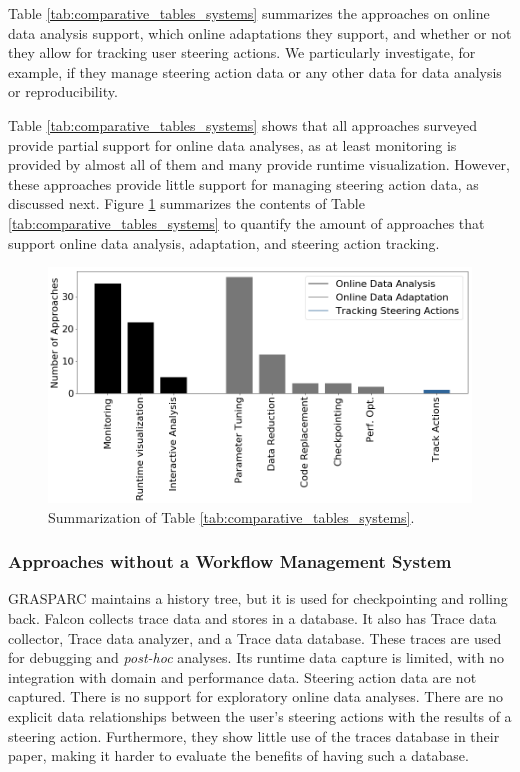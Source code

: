 Table \ref{tab:comparative_tables_systems} summarizes the approaches on  online data analysis support, which online adaptations they support, and whether or not they allow for tracking user steering actions.
We particularly investigate, for example, if they manage steering action data or
any other data for data analysis or reproducibility.




Table \ref{tab:comparative_tables_systems} shows that all approaches surveyed provide partial support for online data analyses, as at
least monitoring is provided by almost all of them and many provide runtime visualization.
However, these approaches provide little support for managing steering action data, as discussed next.
Figure \ref{fig:figtab31} summarizes the contents of Table \ref{tab:comparative_tables_systems} to quantify the amount of approaches that support online data analysis, adaptation, and steering action tracking.


\begin{figure}[H]
    \centering
    \includegraphics[width=\textwidth,keepaspectratio]{img/tab31.png}
    \caption{Summarization of Table \ref{tab:comparative_tables_systems}.}
    \label{fig:figtab31}
\end{figure}


\subsubsection{Approaches without a Workflow Management System}

GRASPARC \cite{Brodlie1993GRASPARC:}
maintains a history tree, but it is used for checkpointing and rolling
back.
Falcon \cite{Gu1995Falcon:} collects trace data and stores in a database. It also has
Trace data collector, Trace data analyzer, and a Trace data database.
These traces are used for debugging and \textit{post-hoc} analyses.
Its runtime data capture is limited, with no integration with domain
and performance data. Steering action data are not
captured. There is no support for exploratory online data analyses. There
are no explicit data relationships between the user's steering actions with
the results of a steering action. Furthermore, they show little use of
the traces database in their paper, making it harder to evaluate
the benefits of having such a database.

